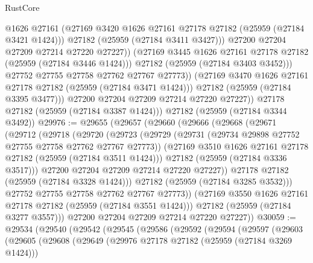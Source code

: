 \begin{lexlean}{RustCore}
\begin{coremodule}
                        @1626
                        @27161
                        (@27169 @3420 @1626 @27161 @27178 @27182 (@25959 (@27184 @3421 @1424)))
                        @27182
                        (@25959 (@27184 @3411 @3427)))
                      @27200
                      @27204
                      @27209
                      @27214
                      @27220
                      @27227))
                  (@27169 @3445 @1626 @27161 @27178 @27182 (@25959 (@27184 @3446 @1424)))
                  @27182
                  (@25959 (@27184 @3403 @3452)))
                @27752
                @27755
                @27758
                @27762
                @27767
                @27773))
            (@27169 @3470 @1626 @27161 @27178 @27182 (@25959 (@27184 @3471 @1424)))
            @27182
            (@25959 (@27184 @3395 @3477)))
          @27200
          @27204
          @27209
          @27214
          @27220
          @27227))
      @27178
      @27182
      (@25959 (@27184 @3387 @1424)))
    @27182
    (@25959 (@27184 @3344 @3492))
@29976 := @29655
    (@29657
      (@29660
        (@29666
          (@29668
            (@29671
              (@29712
                (@29718
                  (@29720
                    (@29723
                      (@29729
                        (@29731 (@29734 @29898 @27752 @27755 @27758 @27762 @27767 @27773))
                        (@27169 @3510 @1626 @27161 @27178 @27182 (@25959 (@27184 @3511 @1424)))
                        @27182
                        (@25959 (@27184 @3336 @3517)))
                      @27200
                      @27204
                      @27209
                      @27214
                      @27220
                      @27227))
                  @27178
                  @27182
                  (@25959 (@27184 @3328 @1424)))
                @27182
                (@25959 (@27184 @3285 @3532)))
              @27752
              @27755
              @27758
              @27762
              @27767
              @27773))
          (@27169 @3550 @1626 @27161 @27178 @27182 (@25959 (@27184 @3551 @1424)))
          @27182
          (@25959 (@27184 @3277 @3557)))
        @27200
        @27204
        @27209
        @27214
        @27220
        @27227))
@30059 := @29534
    (@29540
      (@29542
        (@29545
          (@29586
            (@29592
              (@29594
                (@29597
                  (@29603
                    (@29605
                      (@29608
                        (@29649
                          (@29976 @27178 @27182 (@25959 (@27184 @3269 @1424)))

\end{coremodule}
\end{lexlean}
